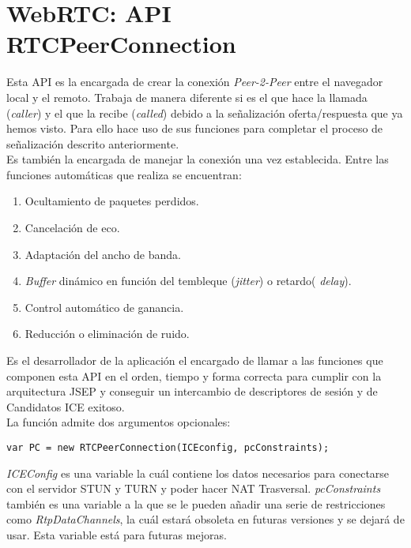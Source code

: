 \section{WebRTC: API RTCPeerConnection}

Esta API es la encargada de crear la conexión \emph{Peer-2-Peer} entre el navegador local y el remoto. Trabaja de manera diferente si es el que hace la llamada (\textit{caller}) y el que la recibe (\textit{called}) debido a la señalización oferta/respuesta que ya hemos visto. Para ello hace uso de sus funciones para completar el proceso de señalización descrito anteriormente.\\

\noindent Es también la encargada de manejar la conexión una vez establecida. Entre las funciones automáticas que realiza se encuentran:\\

\begin{enumerate}
\item Ocultamiento de paquetes perdidos.
\item Cancelación de eco.
\item Adaptación del ancho de banda.
\item \emph{Buffer} dinámico en función del tembleque (\emph{jitter}) o retardo( \emph{delay}).
\item Control automático de ganancia.
\item Reducción o eliminación de ruido.
\end{enumerate}

Es el desarrollador de la aplicación el encargado de llamar a las funciones que componen esta API en el orden, tiempo y forma correcta para cumplir con la arquitectura JSEP y conseguir un intercambio de descriptores de sesión y de Candidatos ICE exitoso.\\

\noindent La función admite dos argumentos opcionales: \\

\begin{lstlisting}[caption=Llamada a función RTCPeerConnection]
var PC = new RTCPeerConnection(ICEconfig, pcConstraints);
\end{lstlisting}

\textit{ICEConfig} es una variable la cuál contiene los datos necesarios para conectarse con el servidor STUN y TURN y poder hacer NAT Trasversal. \textit{pcConstraints} también es una variable a la que se le pueden añadir una serie de restricciones como \textit{RtpDataChannels}, la cuál estará obsoleta en futuras versiones y se dejará de usar. Esta variable está para futuras mejoras.\\

